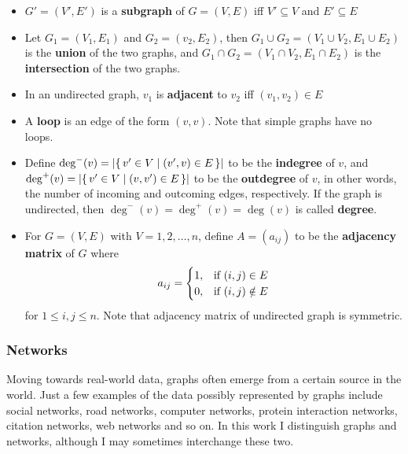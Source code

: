 \begin{definition}
    \begin{itemize}[leftmargin=*]
        \item $G' = (V', E')$ is a \textbf{subgraph} of $G = (V, E)$ iff $V' \subseteq V$ and $E' \subseteq E$
        \item Let $G_1 = (V_1, E_1)$ and $G_2 = (v_2, E_2)$, then $G_1 \cup G_2 = (V_1 \cup V_2, E_1 \cup E_2)$ is the \textbf{union} of the two graphs, and $G_1 \cap G_2 = (V_1 {\cap} V_2, E_1 {\cap} E_2)$ is the \textbf{intersection} of the two graphs.
    \end{itemize}
\end{definition}

\begin{definition}
    \begin{itemize}[leftmargin=*]
        \item In an undirected graph, $v_1$ is \textbf{adjacent} to $v_2$ iff $(v_1, v_2) \in E$
        \item A \textbf{loop} is an edge of the form $(v, v)$.
        Note that simple graphs have no loops.
        \item Define $\deg^-(v) = \left| \{\, v' \in V \mid (v', v) \in E \, \} \right|$ to be the \textbf{indegree} of $v$, and $\deg^+(v) = \left| \{\, v' \in V \mid (v, v') \in E \, \} \right|$ to be the \textbf{outdegree} of $v$, in other words, the number of incoming and outcoming edges, respectively.
        If the graph is undirected, then $\deg^-(v) = \deg^+(v) = \deg(v)$ is called \textbf{degree}.
        \item For $G = (V, E)$ with $V = {1, 2, \dots, n}$, define $A = (a_{ij})$ to be the \textbf{adjacency matrix} of $G$ where
        \[ a_{ij} = \begin{cases}
                        1, & \textnormal{if}\ (i, j) \in E \\
                        0, & \textnormal{if}\ (i, j) \notin E
        \end{cases} \]
        for $1 \leq i, j \leq n$.
        Note that adjacency matrix of undirected graph is symmetric.
    \end{itemize}
\end{definition}

\subsubsection{Networks}

Moving towards real-world data, graphs often emerge from a certain source in the world.
Just a few examples of the data possibly represented by graphs include social networks, road networks, computer networks, protein interaction networks, citation networks, web networks and so on.
In this work I distinguish graphs and networks, although I may sometimes interchange these two.

